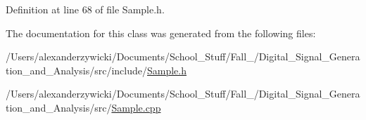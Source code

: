 Definition at line 68 of file Sample.\+h.



The documentation for this class was generated from the following files\+:\begin{DoxyCompactItemize}
\item 
/\+Users/alexanderzywicki/\+Documents/\+School\+\_\+\+Stuff/\+Fall\+\_/\+Digital\+\_\+\+Signal\+\_\+\+Generation\+\_\+and\+\_\+\+Analysis/src/include/\hyperlink{Sample_8h}{Sample.\+h}\item 
/\+Users/alexanderzywicki/\+Documents/\+School\+\_\+\+Stuff/\+Fall\+\_/\+Digital\+\_\+\+Signal\+\_\+\+Generation\+\_\+and\+\_\+\+Analysis/src/\hyperlink{Sample_8cpp}{Sample.\+cpp}\end{DoxyCompactItemize}
